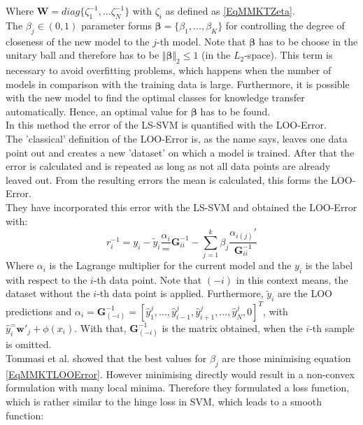 Where $\mathbf{W} = diag\{\zeta_1^{-1},\dots\zeta_N^{-1}\}$ with $\zeta_i$ as defined as \eqref{EqMMKTZeta}.\\
The $\beta_j \in (0,1)$ parameter forms $\boldsymbol{\beta} = \{\beta_1,\dots,\beta_K \}$ for controlling the degree of closeness of the new model to the $j$-th model.
Note that $\boldsymbol{\beta}$ has to be choose in the unitary ball and therefore has to be $\Vert\boldsymbol{\beta}\Vert_2\le 1$ (in the $L_2$-space).
This term is necessary to avoid overfitting problems, which happens when the number of models in comparison with the training data is large.
Furthermore, it is possible with the new model to find the optimal classes for knowledge transfer automatically.
Hence, an optimal value for $\boldsymbol{\beta}$ has to be found.\cite{Tommasi.}\\
In this method the error of the \acs{LS-SVM} is quantified with the \ac{LOO}-Error.\cite{Tommasi.}\\
The 'classical' definition of the \acs{LOO}-Error is, as the name says, leaves one data point out and creates a new 'dataset' on which a model is trained.
After that the error is calculated and is repeated as long as not all data points are already leaved out.
From the resulting errors the mean is calculated, this forms the \acl{LOO}-Error.\cite[p.74-76]{Evgeniou.2004}\\
They have incorporated this error with the \acs{LS-SVM} and obtained the \acs{LOO}-Error with:\cite{Tommasi.}
\begin{equation}\label{EqMMKTLOOError}
	r_i^{-1} = y_i - \tilde{y}_i \frac{\alpha_i} = {\mathbf{G}^{-1}_{ii}} - \sum_{j=1}^{k}\beta_j \frac{\alpha_{i(j)}'}{\mathbf{G}^{-1}_{ii}}
\end{equation}
Where $\alpha_i$ is the Lagrange multiplier for the current model and the $y_i$ is the label with respect to the $i$-th data point.
Note that $(-i)$ in this context means, the dataset without the $i$-th data point is applied.
Furthermore, $\tilde{y}_i$ are the \acs{LOO} predictions and $\alpha_i =\mathbf{G}_(-i)^{-1} = [\hat{y}_1^j,\dots,\hat{y}_{i-1}^j,\hat{y}_{i+1}^j,\dots,\hat{y}_N^j,0]^T$, with $\hat{y}_i^= \mathbf{w}'_j+\phi(x_i)$.
With that, $\mathbf{G}_{(-i)}^{-1}$ is the matrix obtained, when the $i$-th sample is omitted.\\
Tommasi et al. showed that the best values for $\beta_j$ are those minimising equation \eqref{EqMMKTLOOError}.
However minimising directly would result in a non-convex formulation with many local minima.
Therefore they formulated a loss function, which is rather similar to the hinge loss in \acs{SVM}, which leads to a smooth function:\cite{Tommasi.}
